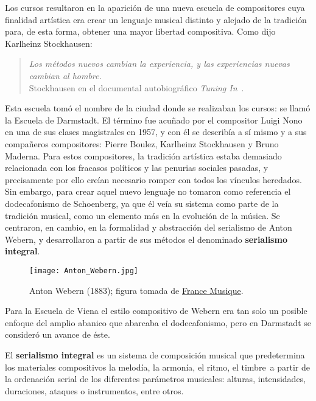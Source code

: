 	Los cursos resultaron en la aparici\'on de una nueva escuela de compositores cuya finalidad art\'istica era crear un lenguaje musical distinto y alejado de la tradici\'on para, de esta forma, obtener una mayor libertad compositiva. Como dijo Karlheinz Stockhausen:
	
	\begin{quote}
		\textit{Los m\'etodos nuevos cambian la experiencia, y las experiencias nuevas cambian al hombre.}\\
		{\footnotesize Stockhausen en el documental autobiogr\'afico \textit{Tuning In}~\cite{stockhausen}.}
	\end{quote}
	
	Esta escuela tom\'o el nombre de la ciudad donde se realizaban los cursos: se llam\'o la Escuela de Darmstadt. El t\'ermino fue acu\~nado por el compositor Luigi Nono en una de sus clases magistrales en 1957, y con \'el se describ\'ia a s\'i mismo y a sus compa\~neros compositores: Pierre Boulez, Karlheinz Stockhausen y Bruno Maderna. Para estos compositores, la tradici\'on art\'istica estaba demasiado relacionada con los fracasos pol\'iticos y las penurias sociales pasadas, y precisamente por ello cre\'ian necesario romper con todos los v\'inculos heredados.
    Sin embargo, para crear aquel nuevo lenguaje no tomaron como referencia el dodecafonismo de Schoenberg, ya que \'el ve\'ia su sistema como parte de la tradici\'on musical, como un elemento m\'as en la evoluci\'on de la m\'usica. Se centraron, en cambio, en la formalidad y abstracci\'on del serialismo de Anton Webern, y desarrollaron a partir de sus m\'etodos el denominado \textbf{serialismo integral}.
    
    \begin{figure}[h]
    	\begin{center}
    		\texttt{[image: Anton\_Webern.jpg]}\\	
    		\caption{Anton Webern (1883); figura tomada de \href{https://www.francemusique.fr/personne/anton-webern}{France Musique}.}
    	\end{center}
    \end{figure}

    Para la Escuela de Viena el estilo compositivo de Webern era tan solo un posible enfoque del amplio abanico que abarcaba el dodecafonismo, pero en Darmstadt se consider\'o un avance de \'este.
	
	El \textbf{serialismo integral} es un sistema de composici\'on musical que predetermina los materiales compositivos \textemdash la melod\'ia, la armon\'ia, el ritmo, el timbre\textemdash~a partir de la ordenaci\'on serial de los diferentes par\'ametros musicales: alturas, intensidades, duraciones, ataques o instrumentos, entre otros. 
	

